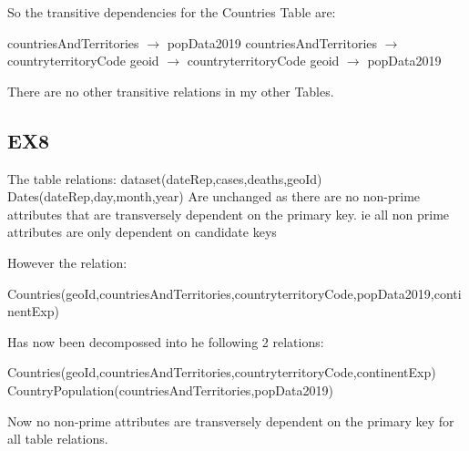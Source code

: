 \documentclass{report}
\begin{document}
	So the transitive dependencies for the Countries Table are: \newline
	
	countriesAndTerritories $\rightarrow$ popData2019\newline
	countriesAndTerritories $\rightarrow$ countryterritoryCode\newline
	geoid $\rightarrow$ countryterritoryCode\newline
	geoid $\rightarrow$ popData2019\newline
	
	There are no other transitive relations in my other Tables.
	
	\subsection{EX8}	
	
	The table relations:\newline
	\newline
	dataset(dateRep,cases,deaths,geoId)\newline
	Dates(dateRep,day,month,year)\newline
	\newline
	Are unchanged as there are no non-prime attributes that are transversely dependent on the primary key. ie all non prime attributes are only dependent on candidate keys\newline\newline
	
	
	However the relation:\newline
	
	Countries(geoId,countriesAndTerritories,countryterritoryCode,popData2019,continentExp)\newline
	
	Has now been decompossed into he following 2 relations:\newline
	
	Countries(geoId,countriesAndTerritories,countryterritoryCode,continentExp)\newline
	CountryPopulation(countriesAndTerritories,popData2019)\newline
	
	Now no non-prime attributes are transversely dependent on the primary key for all table relations.\newline
	\newline\newline
	
\end{document}
